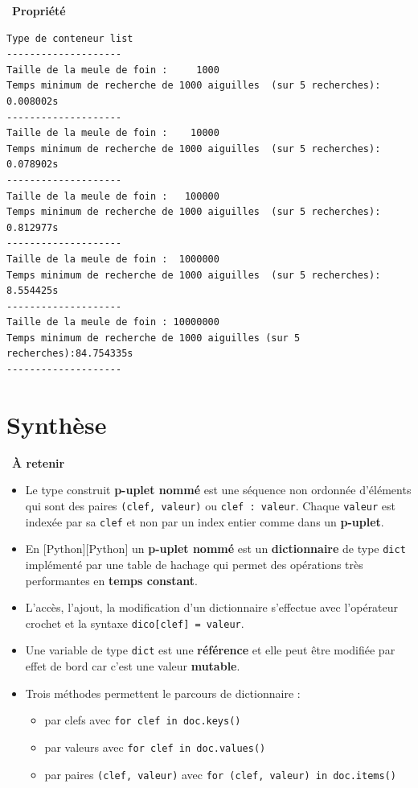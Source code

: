 \documentclass[
  11pt,
]{article}
\newcommand{\passthrough}[1]{#1}
\providecommand{\tightlist}{%
  \setlength{\itemsep}{0pt}\setlength{\parskip}{0pt}}
\newcounter{prop}
\newenvironment{propriete}[1]
{\par \medskip   \addtocounter{prop}{1} \noindent  
\begin{bclogo}[arrondi =0.1,  ombre = true, barre=none, logo=\bcbook, marge=4]{~\textbf{Propriété} \textbf{\theprop} {\itshape #1} }   \par}
{
\end{bclogo}
 \par \bigskip }
\newcounter{cours}
\newenvironment{memo}[1]
{\par \medskip    \noindent  
\begin{bclogo}[arrondi =0.1,  ombre = true, barre=none, logo=\bccle, marge=4]{~\textbf{À retenir}  {\itshape #1} }  \par}
{
\end{bclogo}
 \par \bigskip }
\begin{document}
\begin{propriete}{}
\begin{lstlisting}
Type de conteneur list
--------------------
Taille de la meule de foin :     1000
Temps minimum de recherche de 1000 aiguilles  (sur 5 recherches): 0.008002s
--------------------
Taille de la meule de foin :    10000
Temps minimum de recherche de 1000 aiguilles  (sur 5 recherches): 0.078902s
--------------------
Taille de la meule de foin :   100000
Temps minimum de recherche de 1000 aiguilles  (sur 5 recherches): 0.812977s
--------------------
Taille de la meule de foin :  1000000
Temps minimum de recherche de 1000 aiguilles  (sur 5 recherches): 8.554425s
--------------------
Taille de la meule de foin : 10000000
Temps minimum de recherche de 1000 aiguilles (sur 5 recherches):84.754335s
--------------------
\end{lstlisting}

\end{propriete}

\hypertarget{synthuxe8se}{%
\section{Synthèse}\label{synthuxe8se}}

\begin{memo}{}

\begin{itemize}
\tightlist
\item
  Le type construit \textbf{p-uplet nommé} est une séquence non ordonnée
  d'éléments qui sont des paires
  \passthrough{\lstinline!(clef, valeur)!} ou
  \passthrough{\lstinline!clef : valeur!}. Chaque
  \passthrough{\lstinline!valeur!} est indexée par sa
  \passthrough{\lstinline!clef!} et non par un index entier comme dans
  un \textbf{p-uplet}.
\item
  En {[}Python{]}{[}Python{]} un \textbf{p-uplet nommé} est un
  \textbf{dictionnaire} de type \passthrough{\lstinline!dict!}
  implémenté par une table de hachage qui permet des opérations très
  performantes en \textbf{temps constant}.
\item
  L'accès, l'ajout, la modification d'un dictionnaire s'effectue avec
  l'opérateur crochet et la syntaxe
  \passthrough{\lstinline!dico[clef] = valeur!}.
\item
  Une variable de type \passthrough{\lstinline!dict!} est une
  \textbf{référence} et elle peut être modifiée par effet de bord car
  c'est une valeur \textbf{mutable}.
\item
  Trois méthodes permettent le parcours de dictionnaire :

  \begin{itemize}
  \tightlist
  \item
    par clefs avec \passthrough{\lstinline!for clef in doc.keys()!}
  \item
    par valeurs avec \passthrough{\lstinline!for clef in doc.values()!}
  \item
    par paires \passthrough{\lstinline!(clef, valeur)!} avec
    \passthrough{\lstinline!for (clef, valeur) in doc.items()!}
  \end{itemize}
\end{itemize}

\end{memo}
\end{document}
